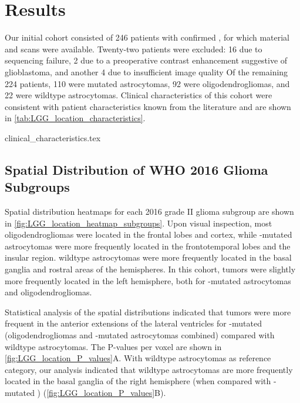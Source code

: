 \section{Results}

Our initial cohort consisted of 246 patients with confirmed , for which  material and  scans were available.
Twenty-two patients were excluded: 16 due to sequencing failure, 2 due to a preoperative contrast enhancement suggestive of glioblastoma, and another 4 due to insufficient image quality
Of the remaining 224 patients, 110 were  mutated astrocytomas, 92 were oligodendrogliomas, and 22 were  wildtype astrocytomas.
Clinical characteristics of this cohort were consistent with  patient characteristics known from the literature and are shown in \cref{tab:LGG_location_characteristics}.

{clinical_characteristics.tex}

\subsection{Spatial Distribution of WHO 2016 Glioma Subgroups}

Spatial distribution heatmaps for each  2016 grade II glioma subgroup are shown in \cref{fig:LGG_location_heatmap_subgroups}.
Upon visual inspection, most oligodendrogliomas were located in the frontal lobes and cortex, while -mutated astrocytomas were more frequently located in the frontotemporal lobes and the insular region.
 wildtype astrocytomas were more frequently located in the basal ganglia and rostral areas of the hemispheres.
In this cohort, \glspl{tumor} were slightly more frequently located in the left hemisphere, both for -mutated astrocytomas and oligodendrogliomas.

Statistical analysis of the spatial distributions indicated that \glspl{tumor} were more frequent in the anterior extensions of the lateral ventricles for -mutated  (oligodendrogliomas and -mutated astrocytomas combined) compared with  wildtype astrocytomas.
The P-values per voxel are shown in \cref{fig:LGG_location_P_values}A.
With  wildtype astrocytomas as reference category, our analysis indicated that  wildtype astrocytomas are more frequently located in the basal ganglia of the right hemisphere (when compared with -mutated ) (\cref{fig:LGG_location_P_values}B).

